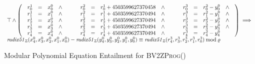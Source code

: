 \begin{figure*}
  \centering
  \[
  \begin{array}{l}
  \top \wedge
  \left(
  \begin{array}{lclcl}
    \begin{array}{rclc}
      {r}^1_0 & = & {x}^0_0 & \wedge \\
      {r}^1_1 & = & {x}^0_1 & \wedge \\
      {r}^1_2 & = & {x}^0_2 & \wedge \\
      {r}^1_3 & = & {x}^0_3 & \wedge \\
      {r}^1_4 & = & {x}^0_4 & \wedge \\
    \end{array}
    &\hspace{.01\textwidth}&
    \begin{array}{rclc}
      {r}^2_0 & = & {r}^1_0 + {4503599627370458} & \wedge \\
      {r}^2_1 & = & {r}^1_1 + {4503599627370494} & \wedge \\
      {r}^2_2 & = & {r}^1_2 + {4503599627370494} & \wedge \\
      {r}^2_3 & = & {r}^1_3 + {4503599627370494} & \wedge \\
      {r}^2_4 & = & {r}^1_4 + {4503599627370494} & \wedge\\
    \end{array}
    &\hspace{.01\textwidth}&
    \begin{array}{rclc}
      {r}^3_0 & = & {r}^2_0 - {y}^0_0 & \wedge \\
      {r}^3_1 & = & {r}^2_1 - {y}^0_1 & \wedge \\
      {r}^3_2 & = & {r}^2_2 - {y}^0_2 & \wedge \\
      {r}^3_3 & = & {r}^2_3 - {y}^0_3 & \wedge \\
      {r}^3_4 & = & {r}^2_4 - {y}^0_4
    \end{array}
  \end{array}
  \right) \implies \\
    \mathit{radix51}_\bbfZ({x}^0_4, {x}^0_3, {x}^0_2, {x}^0_1, {x}^0_0) -
    \mathit{radix51}_\bbfZ({y}^0_4, {y}^0_3, {y}^0_2, {y}^0_1, {y}^0_0)
    \equiv
    \mathit{radix51}_\bbfZ({r}^3_4, {r}^3_3, {r}^3_2, {r}^3_1, {r}^3_0)
    \mod \myprime
  \end{array}
  \]
  \caption{Modular Polynomial Equation Entailment for \textsc{BV2ZProg}()}
  \label{figure:translation:subtraction-polynomial}
\end{figure*}

